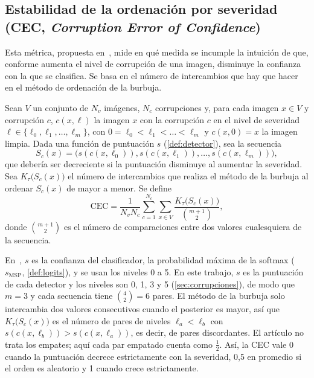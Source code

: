 \subsection{Estabilidad de la ordenación por severidad (CEC, \textit{Corruption Error of Confidence})}\label{sec:cec}

Esta métrica, propuesta en~\cite{zhang2022corruptions}, mide en qué medida se incumple la intuición de que, conforme aumenta el nivel de corrupción de una imagen, disminuye la confianza con la que se clasifica. Se basa en el número de intercambios que hay que hacer en el método de ordenación de la burbuja.
\begin{definicion}[CEC]\label{def:cec}
Sean $V$ un conjunto de $N_v$ imágenes, $N_c$ corrupciones y, para cada imagen $x \in V$ y corrupción $c$, $c(x, \ell)$ la imagen $x$ con la corrupción $c$ en el nivel de severidad $\ell \in \{\ell_0, \ell_1, \dots, \ell_m\}$, con $0 = \ell_0 < \ell_1 < \dots < \ell_m$ y $c(x, 0) = x$ la imagen limpia. Dada una función de puntuación $s$ (\cref{def:detector}), sea la secuencia
\[
  S_c(x) = \bigl(s(c(x, \ell_0)), s(c(x, \ell_1)), \dots, s(c(x, \ell_m))\bigr),
\]
que debería ser decreciente si la puntuación disminuye al aumentar la severidad. Sea $K_\tau\bigl(S_c(x)\bigr)$ el número de intercambios que realiza el método de la burbuja al ordenar $S_c(x)$ de mayor a menor. Se define~\cite[ec.~(5)]{zhang2022corruptions}
\[
  \mathrm{CEC} = \frac{1}{N_v N_c} \sum_{c=1}^{N_c} \sum_{x \in V} \frac{K_\tau\bigl(S_c(x)\bigr)}{\binom{m+1}{2}},
\]
donde $\binom{m+1}{2}$ es el número de comparaciones entre dos valores cualesquiera de la secuencia.
\end{definicion}

En~\cite{zhang2022corruptions}, $s$ es la confianza del clasificador, la probabilidad máxima de la softmax ($s_{\mathrm{MSP}}$, \cref{def:logits}), y se usan los niveles 0 a 5. En este trabajo, $s$ es la puntuación de cada detector y los niveles son 0, 1, 3 y 5 (\cref{sec:corrupciones}), de modo que $m = 3$ y cada secuencia tiene $\binom{4}{2} = 6$ pares. El método de la burbuja solo intercambia dos valores consecutivos cuando el posterior es mayor, así que $K_\tau\bigl(S_c(x)\bigr)$ es el número de pares de niveles $\ell_a < \ell_b$ con $s(c(x, \ell_b)) > s(c(x, \ell_a))$, es decir, de pares discordantes. El artículo no trata los empates; aquí cada par empatado cuenta como $\tfrac{1}{2}$. Así, la CEC vale 0 cuando la puntuación decrece estrictamente con la severidad, 0,5 en promedio si el orden es aleatorio y 1 cuando crece estrictamente.

